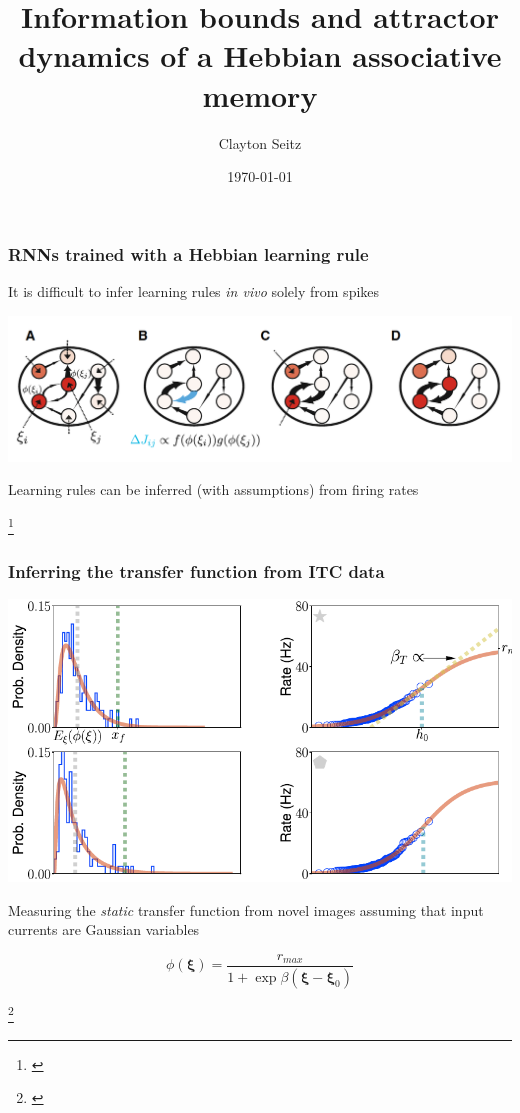 \documentclass{beamer}
\begin{document}
\title{Information bounds and attractor dynamics of a Hebbian associative memory}  
\author{Clayton Seitz}
\date{\today} 

\begin{frame}[plain]
\titlepage
\end{frame}

\begin{frame}[plain]
\frametitle{RNNs trained with a Hebbian learning rule}

It is difficult to infer learning rules \emph{in vivo} solely from spikes


\begin{center}
\includegraphics[scale=0.5]{network-diagram}
\end{center}


\vspace{0.2in}

Learning rules can be inferred (with assumptions) from firing rates

\footnote{\cite{peirera}}

\end{frame}


\begin{frame}[plain]
\frametitle{Inferring the transfer function from ITC data}

\vspace{0.2in}

\begin{center}
\includegraphics[scale=0.5]{transfer-function}
\end{center}

Measuring the \emph{static} transfer function from novel images assuming that input currents are Gaussian variables

\begin{equation*}
\phi(\bm{\xi}) = \frac{r_{max}}{1 + \exp \beta (\bm{\xi}- \bm{\xi}_{0})}
\end{equation*}


\footnote{\cite{peirera}}
\end{frame}
\end{document}
